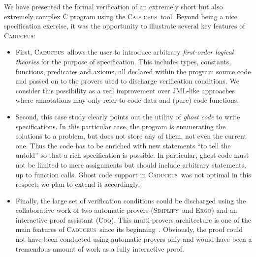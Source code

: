 \documentclass[a4paper]{llncs}
\newcommand{\caduceus}{\textsc{Caduceus}}
\newcommand{\simplify}{\textsc{Simplify}}
\newcommand{\ergo}{\textsc{Ergo}}
\newcommand{\coq}{\textsc{Coq}}
\begin{document}
We have presented the formal verification of an extremely short but
also extremely complex C program using the \caduceus\ tool. Beyond
being a nice specification exercise, it was the opportunity to illustrate
several key features of \caduceus:
\begin{itemize}
\item 
  First, \caduceus\ allows the user to introduce arbitrary
  \emph{first-order logical theories} for the purpose of
  specification. This includes types, constants, functions, predicates
  and axioms, all declared within the program source code and passed on
  to the provers used to discharge verification conditions.
  We consider this possibility as a real improvement over
  JML-like approaches~\cite{JML} where annotations may only refer to code data
  and (pure) code functions. 

\item 
  Second, this case study clearly points out the utility of
  \emph{ghost code} to write specifications. In this particular case,
  the program is enumerating the solutions to a problem, but does not
  store any of them, not even the current one. Thus the code has to
  be enriched with new statements ``to tell the untold'' so that a
  rich specification is possible. In particular, ghost code must not be
  limited to mere assignments but should include arbitrary statements,
  up to function calls. Ghost code support in \caduceus\ was
  not optimal in this respect; we plan to extend it accordingly.

\item 
  Finally, the large set of verification conditions could be
  discharged using the collaborative work of two automatic provers
  (\simplify\ and \ergo) and an interactive proof assistant
  (\coq). This multi-provers architecture is one of the main features
  of \caduceus\ since its
  beginning~\cite{FilliatreMarche04}. Obviously, the proof could not
  have been conducted using automatic provers only and would have been
  a tremendous amount of work as a fully interactive proof.
\end{itemize}
\end{document}

